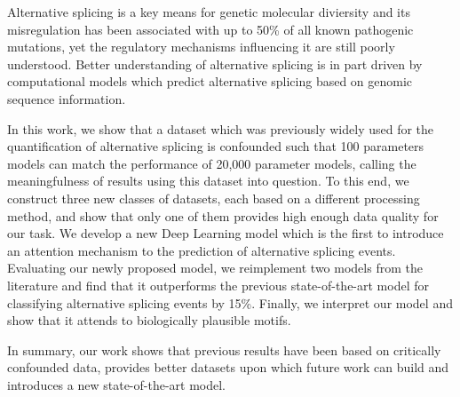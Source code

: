
Alternative splicing is a key means for genetic molecular diviersity
and its misregulation has been associated with up to 50\% of all known pathogenic mutations, yet the regulatory mechanisms influencing it are still poorly understood. Better understanding of alternative splicing is in part driven by computational models which predict alternative splicing based on genomic sequence information. 

In this work, we show that a dataset which was previously widely used for the quantification of alternative splicing is confounded such that 100 parameters models can match the performance of 20,000 parameter models, calling the meaningfulness of results using this dataset into question. To this end, we construct three new classes of datasets, each based on a different processing method, and show that only one of them provides high enough data quality for our task. We develop a new Deep Learning model which is the first to introduce an attention mechanism to the prediction of alternative splicing events. Evaluating our newly proposed model, we reimplement two models from the literature and find that it outperforms the previous state-of-the-art model for classifying alternative splicing events by 15\%. Finally, we interpret our model and show that it attends to biologically plausible motifs. 

In summary, our work shows that previous results have been based on critically confounded data,
provides better datasets upon which future work can build and introduces a new state-of-the-art model. 

